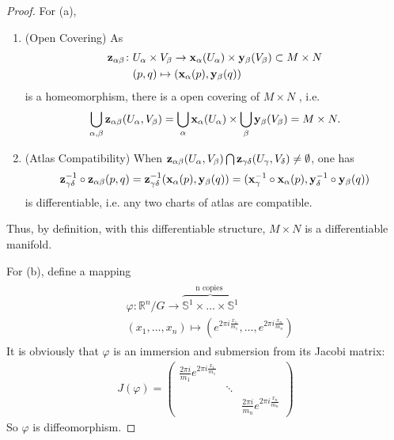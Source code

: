 \begin{proof}
For (a), \begin{enumerate}
    \item (Open Covering) As 
    \begin{align*}
        \mathbf{z}_{\alpha\beta} \colon & U_\alpha\times V_\beta \to \mathbf{x}_\alpha (U_\alpha)\times \mathbf{y}_{\beta}(V_\beta)\subset M\times N\\ 
        &(p,q) \mapsto (\mathbf{x}_\alpha(p),\mathbf{y}_\beta(q))
    \end{align*}
        is a homeomorphism, there is a open covering of $M\times N$ , i.e. 
        \[\bigcup_{\alpha,\beta}\mathbf{z}_{\alpha\beta}(U_\alpha,V_\beta)=\bigcup_\alpha \mathbf{x}_\alpha (U_\alpha)\times \bigcup_\beta \mathbf{y}_\beta (V_\beta)=M\times N.\]
    \item (Atlas Compatibility) When $\mathbf{z}_{\alpha\beta}(U_\alpha,V_\beta)\bigcap \mathbf{z}_{\gamma\delta}(U_\gamma,V_\delta)\neq \emptyset$, one has 
    \[\mathbf{z}_{\gamma\delta}^{-1}\circ \mathbf{z}_{\alpha\beta} (p,q)=\mathbf{z}_{\gamma\delta}^{-1}(\mathbf{x}_\alpha(p),\mathbf{y}_\beta(q))=(\mathbf{x}_\gamma^{-1}\circ \mathbf{x}_\alpha(p),\mathbf{y}_\delta^{-1}\circ \mathbf{y}_\beta(q))\]
    is differentiable, i.e. any two charts of atlas are compatible.
\end{enumerate}
Thus, by definition, with this differentiable structure, $M\times N$ is a differentiable manifold.

For (b), define a mapping
\begin{align*}
\begin{aligned}
& \varphi: \mathbb{R}^n / G \rightarrow \overbrace{\mathbb{S}^1 \times \ldots \times \mathbb{S}^1}^{\mathrm{n} \text { copies }} \\
& \left(x_1, \ldots, x_n\right) \mapsto\left(e^{2 \pi i \frac{x_1}{m_1}}, \ldots, e^{2 \pi i \frac{x_n}{m_n}}\right)
\end{aligned}
\end{align*}
It is obviously that $\varphi$ is an immersion and submersion from its Jacobi matrix:
\begin{align*}
J(\varphi)=\left(\begin{array}{ccc}
\frac{2 \pi i}{m_1} e^{2 \pi i \frac{x_1}{m_1}} & \\
& \ddots & \\
& & \frac{2 \pi i}{m_n} e^{2 \pi i \frac{x_n}{m_n}}
\end{array}\right)
\end{align*}
So $\varphi$ is diffeomorphism.
\end{proof}

